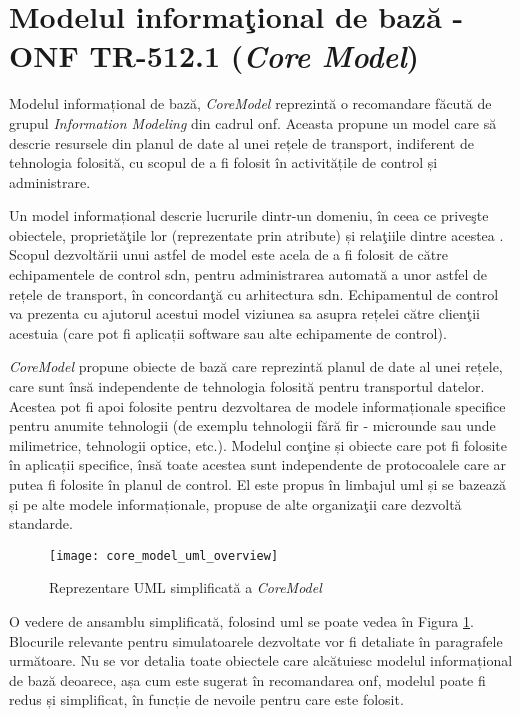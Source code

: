 \section{Modelul informaţional de bază - ONF TR-512.1 (\textit{Core Model})}

Modelul informațional de bază, \textit{CoreModel} reprezintă o recomandare făcută de grupul \textit{Information Modeling} din cadrul \gls{onf}. Aceasta propune un model care să descrie resursele din planul de date al unei rețele de transport, indiferent de tehnologia folosită, cu scopul de a fi folosit în activitățile de control și administrare.

Un model informațional descrie lucrurile dintr-un domeniu, în ceea ce priveşte obiectele, proprietăţile lor (reprezentate prin atribute) și relaţiile dintre acestea \cite{onftr512v1.0}. Scopul dezvoltării unui astfel de model este acela de a fi folosit de către echipamentele de control \gls{sdn}, pentru administrarea automată a unor astfel de rețele de transport, în concordanţă cu arhitectura \gls{sdn}. Echipamentul de control va prezenta cu ajutorul acestui model viziunea sa asupra rețelei către clienţii acestuia (care pot fi aplicații software sau alte echipamente de control).

\textit{CoreModel} propune obiecte de bază care reprezintă planul de date al unei rețele, care sunt însă independente de tehnologia folosită pentru transportul datelor. Acestea pot fi apoi folosite pentru dezvoltarea de modele informaționale specifice pentru anumite tehnologii (de exemplu tehnologii fără fir - microunde sau unde milimetrice, tehnologii optice, etc.). Modelul conţine și obiecte care pot fi folosite în aplicații specifice, însă toate acestea sunt independente de protocoalele care ar putea fi folosite în planul de control. El este propus în limbajul \gls{uml} și se bazează și pe alte modele informaționale, propuse de alte organizaţii care dezvoltă standarde.

\begin{figure}[t]
	\centering
	\texttt{[image: core\_model\_uml\_overview]}
	\caption{Reprezentare UML simplificată a \textit{CoreModel}}
	\label{fig:core_model}
\end{figure}

O vedere de ansamblu simplificată, folosind \gls{uml} se poate vedea în Figura \ref{fig:core_model}. Blocurile relevante pentru simulatoarele dezvoltate vor fi detaliate în paragrafele următoare. Nu se vor detalia toate obiectele care alcătuiesc modelul informațional de bază deoarece, așa cum este sugerat în recomandarea \gls{onf}, modelul poate fi redus și simplificat, în funcție de nevoile pentru care este folosit.  

